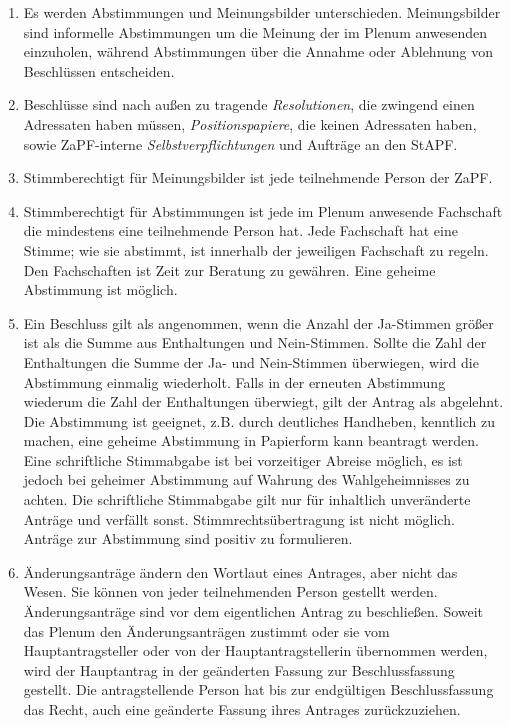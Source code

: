 \begin{enumerate}
\item Es werden Abstimmungen und Meinungsbilder unterschieden. Meinungsbilder
sind informelle Abstimmungen um die Meinung der im Plenum anwesenden
einzuholen, während Abstimmungen über die Annahme oder Ablehnung von
Beschlüssen entscheiden.

\item Beschlüsse sind nach außen zu tragende \emph{Resolutionen}, die zwingend einen
Adressaten haben müssen, \emph{Positionspapiere}, die keinen Adressaten haben,
sowie ZaPF-interne \emph{Selbstverpflichtungen} und Aufträge an den StAPF.

\item Stimmberechtigt für Meinungsbilder ist jede teilnehmende Person der ZaPF.

\item Stimmberechtigt für Abstimmungen ist jede im Plenum anwesende Fachschaft
die mindestens eine teilnehmende Person hat.
Jede Fachschaft hat eine Stimme; wie sie abstimmt, ist innerhalb der
jeweiligen Fachschaft zu regeln.
Den Fachschaften ist Zeit zur Beratung zu gewähren.
Eine geheime Abstimmung ist möglich.

\item Ein Beschluss gilt als angenommen, wenn die Anzahl der Ja-Stimmen größer
ist als die Summe aus Enthaltungen und Nein-Stimmen.
Sollte die Zahl der Enthaltungen die Summe der Ja- und Nein-Stimmen
überwiegen, wird die Abstimmung einmalig wiederholt.
Falls in der erneuten Abstimmung wiederum die Zahl der Enthaltungen
überwiegt, gilt der Antrag als abgelehnt.
Die Abstimmung ist geeignet, z.B. durch deutliches Handheben, kenntlich zu
machen, eine geheime Abstimmung in Papierform kann beantragt werden.
Eine schriftliche Stimmabgabe ist bei vorzeitiger Abreise möglich, es ist
jedoch bei geheimer Abstimmung auf Wahrung des Wahlgeheimnisses zu achten.
Die schriftliche Stimmabgabe gilt nur für inhaltlich unveränderte Anträge
und verfällt sonst.
Stimmrechtsübertragung ist nicht möglich.
Anträge zur Abstimmung sind positiv zu formulieren.

\item Änderungsanträge ändern den Wortlaut eines Antrages, aber nicht das Wesen.
Sie können von jeder teilnehmenden Person gestellt werden.
Änderungsanträge sind vor dem eigentlichen Antrag zu beschließen.
Soweit das Plenum den Änderungsanträgen zustimmt oder sie vom
Hauptantragsteller oder von der Hauptantragstellerin übernommen werden,
wird der Hauptantrag in der geänderten Fassung zur Beschlussfassung gestellt.
Die antragstellende Person hat bis zur endgültigen Beschlussfassung das Recht,
auch eine geänderte Fassung ihres Antrages zurückzuziehen.


\end{enumerate}
